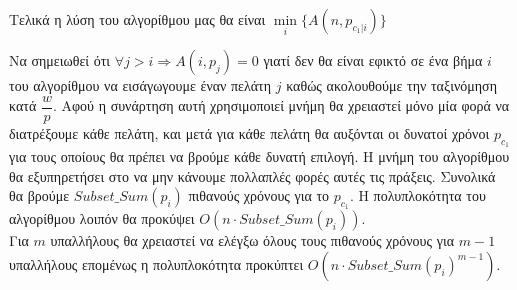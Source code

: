 \documentclass{article} \usepackage[greek,english]{babel}
\begin{document}
\begin{center}
    Τελικά η λύση του αλγορίθμου μας θα είναι $\min\limits_{i}\{Α(n,p_{c_1|i})\}$ \\ 
\end{center}

Να σημειωθεί ότι $\forall j > i \Rightarrow A(i,p_j) = 0$ γιατί δεν θα είναι εφικτό σε ένα βήμα $i$ 
του αλγορίθμου να εισάγωγουμε έναν πελάτη $j$ καθώς ακολουθούμε την ταξινόμηση κατά $\dfrac{w}{p}$. 
Αφού η συνάρτηση αυτή χρησιμοποιεί μνήμη θα χρειαστεί μόνο μία φορά να διατρέξουμε κάθε πελάτη, και
μετά για κάθε πελάτη θα αυξόνται οι δυνατοί χρόνοι $p_{c_1}$ για τους οποίους θα πρέπει να βρούμε κάθε
δυνατή επιλογή. Η μνήμη του αλγορίθμου θα εξυπηρετήσει στο να μην κάνουμε πολλαπλές φορές αυτές τις πράξεις.
Συνολικά θα βρούμε $Subset\_Sum(p_i)$ πιθανούς χρόνους για το $p_{c_1}$. Η πολυπλοκότητα του αλγορίθμου λοιπόν
θα προκύψει $Ο(n\cdot Subset\_Sum(p_i))$. \\

Για $m$ υπαλλήλους θα χρειαστεί να ελέγξω όλους τους πιθανούς χρόνους για $m-1$ υπαλλήλους επομένως
η πολυπλοκότητα προκύπτει $O(n\cdot Subset\_Sum(p_i)^{m-1})$.


\pagebreak
\end{document}
